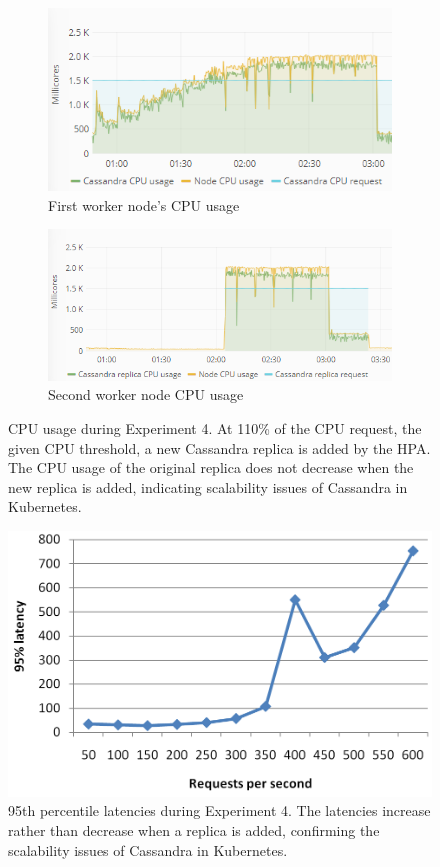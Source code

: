 \begin{figure}
\centering
\begin{subfigure}[b]{\columnwidth}
\centering
\includegraphics[width=0.70\columnwidth]{Images/Experiments/CPU/Grafana/cpu-cas-hpa-li-1.PNG}
\caption{First worker node's CPU usage}
\label{fig:cpu-cas-hpa-li-1}
\end{subfigure}
\hfill
\begin{subfigure}[b]{\columnwidth}
\centering
\includegraphics[width=0.70\columnwidth]{Images/Experiments/CPU/Grafana/cpu-cas-hpa-li-2.PNG}
\caption{Second worker node CPU usage}
\label{fig:cpu-cas-hpa-li-2}
\end{subfigure}
\hfill
\caption{CPU usage during Experiment 4. At 110\% of the CPU request, the given CPU threshold, a new Cassandra replica is added by the HPA. The CPU usage of the original replica does not decrease when the new replica is added, indicating scalability issues of Cassandra in Kubernetes.}
\label{fig:cpu-cas-hpa-li}
\end{figure}

\begin{figure}
\centering
\includegraphics[width=0.55\columnwidth]{Images/Experiments/CPU/Latencies/lat-cas-hpa-li.PNG}
\caption{95th percentile latencies during Experiment 4. The latencies increase rather than decrease when a replica is added, confirming the scalability issues of Cassandra in Kubernetes.}
\label{fig:lat-cas-hpa-li}
\end{figure}

